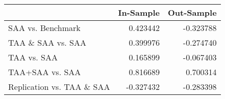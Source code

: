\begin{tabular}{lrr}
\toprule
{} &  In-Sample &  Out-Sample \\
\midrule
SAA vs. Benchmark         &   0.423442 &   -0.323788 \\
TAA \& SAA vs. SAA         &   0.399976 &   -0.274740 \\
TAA vs. SAA               &   0.165899 &   -0.067403 \\
TAA+SAA vs. SAA           &   0.816689 &    0.700314 \\
Replication vs. TAA \& SAA &  -0.327432 &   -0.283398 \\
\bottomrule
\end{tabular}
